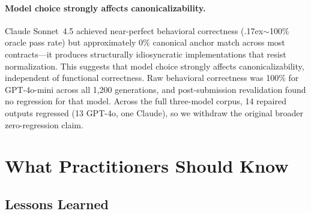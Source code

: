 \documentclass[sigconf]{acmart}
\begin{document}
\paragraph{Model choice strongly affects canonicalizability.}
Claude Sonnet~4.5 achieved near-perfect behavioral correctness ({\raise.17ex\hbox{$\scriptstyle\sim$}}100\% oracle pass rate) but approximately 0\% canonical anchor match across most contracts---it produces structurally idiosyncratic implementations that resist normalization.  This suggests that model choice strongly affects canonicalizability, independent of functional correctness. Raw behavioral correctness was 100\% for GPT-4o-mini across all 1{,}200 generations, and post-submission revalidation found no regression for that model. Across the full three-model corpus, 14 repaired outputs regressed (13 GPT-4o, one Claude), so we withdraw the original broader zero-regression claim.

\section{What Practitioners Should Know}
\label{sec:practitioners}

\subsection{Lessons Learned}
\label{sec:lessons}
\end{document}
